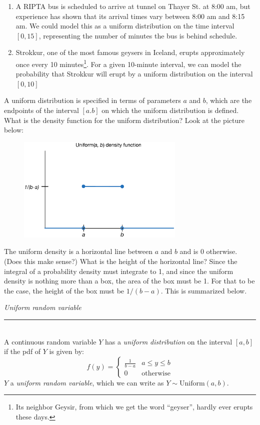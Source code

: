 \documentclass[12pt]{article}
\theoremstyle{definition}
\theoremstyle{remark}
\begin{document}
\begin{enumerate}
\item A RIPTA bus is scheduled to arrive at tunnel on Thayer St. at 8:00 am, but experience has shown that its arrival times vary between 8:00 am and 8:15 am. We could model this as a uniform distribution on the time interval $[0, 15]$, representing the number of minutes the bus is behind schedule. 
\item Strokkur, one of the most famous geysers in Iceland, erupts approximately once every 10 minutes\footnote{Its neighbor Geysir, from which we get the word ``geyser'', hardly ever erupts these days.}. For a given 10-minute interval, we can model the probability that Strokkur will erupt by a uniform distribution on the interval $[0, 10]$
\end{enumerate}

A uniform distribution is specified in terms of parameters $a$ and $b$, which are the endpoints of the interval $[a. b]$ on which the uniform distribution is defined. What is the density function for the uniform distribution? Look at the picture below:
\begin{figure}[H]
\centering
\includegraphics[width=8cm]{uniformdensity.eps}
\end{figure}
The uniform density is a horizontal line between $a$ and $b$ and is 0 otherwise. (Does this make sense?) What is the height of the horizontal line? Since the integral of a probability density must integrate to 1, and since the uniform density is nothing more than a box, the area of the box must be 1. For that to be the case, the height of the box must be $1 / (b-a)$. This is summarized below.

\begin{framed}
\emph{Uniform random variable}\\
  \rule{\dimexpr{}\fboxrule}{.1pt} \\
A continuous random variable $Y$ has a \emph{uniform distribution} on the interval $[a, b]$ if the pdf of $Y$
is given by:
\[
f(y) = \begin{cases}
\frac{1}{b-a} & a \leq y \leq b \\
0 & \text{otherwise}
\end{cases}
\]
$Y$ a \emph{uniform random variable}, which we can write as $Y \sim\text{Uniform}(a,b)$.
\end{framed}
\end{document}
